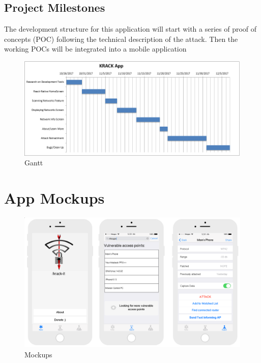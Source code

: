 \documentclass[11pt,]{article}
\begin{document}
\subsection{Project Milestones}\label{project-milestones}

The development structure for this application will start with a series
of proof of concepts (POC) following the technical description of the
attack. Then the working POCs will be integrated into a mobile
application

\begin{figure}
\centering
\includegraphics{images/gantt.png}
\caption{Gantt}
\end{figure}

\newpage

\section{App Mockups}\label{app-mockups}

\begin{figure}
\centering
\includegraphics{images/mockup.png}
\caption{Mockups}
\end{figure}

\newpage


\end{document}
